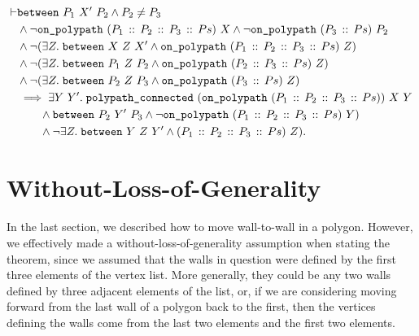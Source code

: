 \begin{equation}\label{eq:PolygonMove}
  \begin{split}
\vdash    &\texttt{between}\ P_1\ X'\ P_2 \wedge P_2 \neq P_3\\
    &\wedge \neg\texttt{on\_polypath}\ (P_1\,::\,P_2\,::\,P_3\,::\,Ps)\ X \wedge \neg\texttt{on\_polypath}\ (P_3\,::\,Ps)\ P_2\\
    &\wedge \neg(\exists Z.\; \texttt{between}\ X\ Z\ X' \wedge \texttt{on\_polypath}\ (P_1\,::\,P_2\,::\,P_3\,::\,Ps)\ Z)\\
    &\wedge \neg(\exists Z.\; \texttt{between}\ P_1\ Z\ P_2 \wedge \texttt{on\_polypath}\ (P_2\,::\,P_3\,::\,Ps)\ Z)\\
    &\wedge \neg(\exists Z.\; \texttt{between}\ P_2\ Z\ P_3 \wedge \texttt{on\_polypath}\ (P_3\,::\,Ps)\ Z)\\
    &\implies \exists Y\ Y'.\; \texttt{polypath\_connected}\ (\texttt{on\_polypath}\ (P_1\,::\,P_2\,::\,P_3\,::\,Ps))\ X\ Y\\
    &\qquad\wedge \texttt{between}\ P_2\ Y'\ P_3\wedge \neg\texttt{on\_polypath}\ (P_1\,::\,P_2\,::\,P_3\,::\,Ps)\ Y)\\
    &\qquad\wedge \neg\exists Z.\; \texttt{between}\ Y\ Z\ Y' \wedge (P_1\,::\,P_2\,::\,P_3\,::\,Ps)\ Z).
  \end{split}
\end{equation}

\section{Without-Loss-of-Generality}
In the last section, we described how to move wall-to-wall in a polygon. However, we effectively made a without-loss-of-generality assumption when stating the theorem, since we assumed that the walls in question were defined by the first three elements of the vertex list. More generally, they could be any two walls defined by  three adjacent elements of the list, or, if we are considering moving forward from the last wall of a polygon back to the first, then the vertices defining the walls come from the last two elements and the first two elements.

